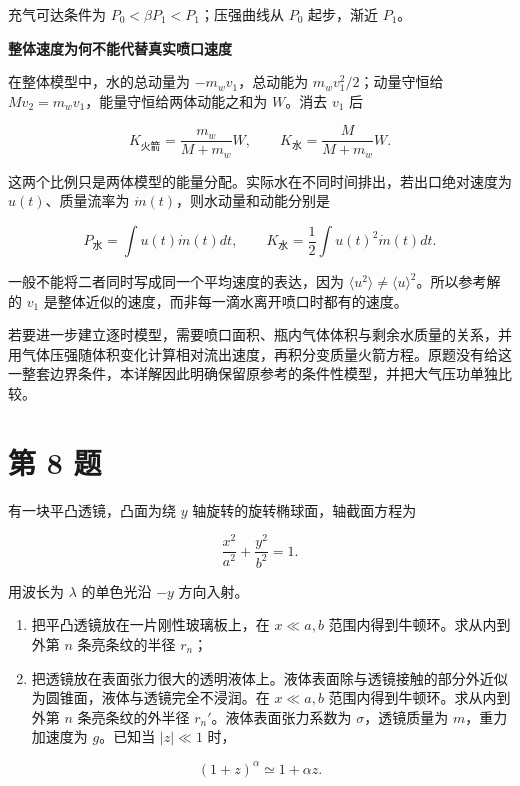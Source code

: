 \documentclass[12pt,a4paper,UTF8]{ctexart}
\newcommand{\tightlist}{\setlength{\itemsep}{0pt}\setlength{\parskip}{0pt}}
\begin{document}
充气可达条件为 \(P_0<\beta P_1<P_1\)；压强曲线从 \(P_0\) 起步，渐近
\(P_1\)。

\textbf{整体速度为何不能代替真实喷口速度}

在整体模型中，水的总动量为 \(-m_wv_1\)，总动能为
\(m_wv_1^2/2\)；动量守恒给 \(Mv_2=m_wv_1\)，能量守恒给两体动能之和为
\(W\)。消去 \(v_1\) 后

\[K_{\text{火箭}}=\frac{m_w}{M+m_w}W,\qquad K_{\text{水}}=\frac M{M+m_w}W.\]

这两个比例只是两体模型的能量分配。实际水在不同时间排出，若出口绝对速度为
\(u(t)\)、质量流率为 \(\dot m(t)\)，则水动量和动能分别是

\[P_{\text{水}}=\int u(t)\dot m(t)dt,\qquad K_{\text{水}}=\frac12\int u(t)^2\dot m(t)dt.\]

一般不能将二者同时写成同一个平均速度的表达，因为
\(\langle u^2\rangle\ne\langle u\rangle^2\)。所以参考解的 \(v_1\)
是整体近似的速度，而非每一滴水离开喷口时都有的速度。

若要进一步建立逐时模型，需要喷口面积、瓶内气体体积与剩余水质量的关系，并用气体压强随体积变化计算相对流出速度，再积分变质量火箭方程。原题没有给这一整套边界条件，本详解因此明确保留原参考的条件性模型，并把大气压功单独比较。

\newpage

\section{第 8 题}\label{ux7b2c-8-ux9898}

有一块平凸透镜，凸面为绕 \(y\) 轴旋转的旋转椭球面，轴截面方程为

\[
\frac{x^2}{a^2}+\frac{y^2}{b^2}=1.
\]

用波长为 \(\lambda\) 的单色光沿 \(-y\) 方向入射。

\begin{enumerate}
\def\labelenumi{\arabic{enumi}.}
\tightlist
\item
  把平凸透镜放在一片刚性玻璃板上，在 \(x\ll a,b\)
  范围内得到牛顿环。求从内到外第 \(n\) 条亮条纹的半径 \(r_n\)；
\item
  把透镜放在表面张力很大的透明液体上。液体表面除与透镜接触的部分外近似为圆锥面，液体与透镜完全不浸润。在
  \(x\ll a,b\) 范围内得到牛顿环。求从内到外第 \(n\) 条亮条纹的外半径
  \(r_n'\)。液体表面张力系数为 \(\sigma\)，透镜质量为
  \(m\)，重力加速度为 \(g\)。已知当 \(|z|\ll1\) 时，
\end{enumerate}

\[
(1+z)^\alpha\simeq1+\alpha z.
\]
\end{document}
